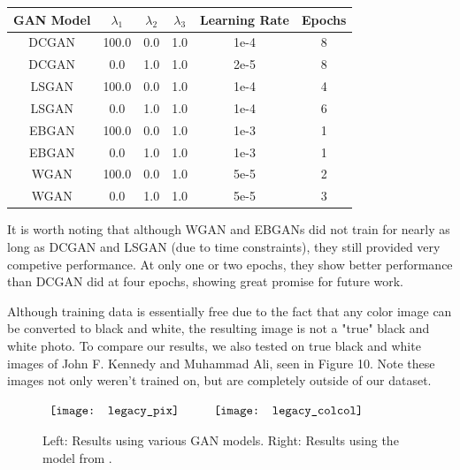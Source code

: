\documentclass[10pt]{article}
\begin{document}
\begin{center}
\begin{tabular}{|c|c|c|c|c|c|}
   \hline
      \textbf{GAN Model} & \textbf{$\lambda_1$} & \textbf{$\lambda_2$} & $\lambda_3$ & \textbf{Learning Rate} & \textbf{Epochs} \\ \hline
      DCGAN & 100.0 & 0.0 & 1.0 & 1e-4 & 8 \\ \hline
      DCGAN & 0.0   & 1.0 & 1.0 & 2e-5 & 8 \\ \hline
      LSGAN & 100.0 & 0.0 & 1.0 & 1e-4 & 4 \\ \hline
      LSGAN & 0.0   & 1.0 & 1.0 & 1e-4 & 6 \\ \hline
      EBGAN & 100.0 & 0.0 & 1.0 & 1e-3 & 1 \\ \hline
      EBGAN & 0.0   & 1.0 & 1.0 & 1e-3 & 1 \\ \hline
      WGAN  & 100.0 & 0.0 & 1.0 & 5e-5 & 2 \\ \hline
      WGAN  & 0.0   & 1.0 & 1.0 & 5e-5 & 3 \\ \hline
\end{tabular}
\end{center}

It is worth noting that although WGAN and EBGANs did not train for nearly as long as DCGAN and LSGAN (due to time constraints), they still provided very competive performance.
At only one or two epochs, they show better performance than DCGAN did at four epochs, showing great promise for future work.

Although training data is essentially free due to the fact that any color image can be converted to black and white, the resulting image is not a "true" black and white photo. To
compare our results, we also tested on true black and white images of John F. Kennedy and Muhammad Ali, seen in Figure 10. Note these images not only weren't trained on, but are completely outside of our dataset.

\begin{figure}[!htb]
   \begin{center}$
      \begin{array}{cccc}
         \texttt{[image: legacy\_pix]} \hspace{10mm}
         \texttt{[image: legacy\_colcol]}
      \end{array}$
   \end{center}
   \caption{Left: Results using various GAN models. Right: Results using the model from \cite{zhao2016energy}.}
\end{figure}
\end{document}
